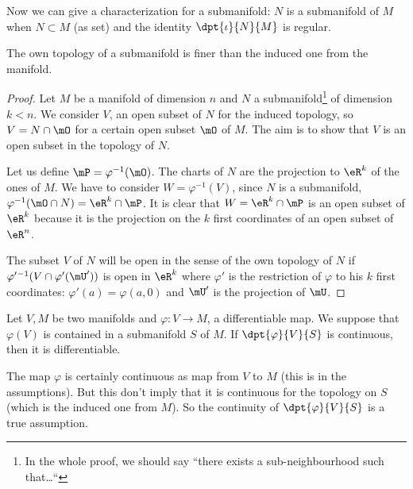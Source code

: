 Now we can give a characterization for a submanifold: $N$ is a submanifold of $M$ when $N\subset M$ (as set) and the identity $\dpt{\iota}{N}{M}$ is regular.\label{pg:caract_subvar}

\begin{proposition}\label{prop:topo_sub_manif}
The own topology of a submanifold is finer than the induced one from the manifold.
\end{proposition}

\begin{proof}
Let $M$ be a manifold of dimension $n$ and $N$ a submanifold\footnote{In the whole proof, we should say ``there exists a sub-neighbourhood such that\ldots``} of dimension $k<n$. We consider $V$, an open subset of $N$ for the induced topology, so $V=N\cap\mO$ for a certain open subset $\mO$ of $M$. The aim is to show that $V$ is an open subset in the topology of $N$.

Let us define $\mP=\varphi^{-1}(\mO)$.  The charts of $N$ are the projection to $\eR^k$ of the ones of $M$. We have to consider $W=\varphi^{-1}(V)$, since $N$ is a submanifold, $\varphi^{-1}(\mO\cap N)=\eR^k\cap\mP$. It is clear that $W=\eR^k\cap\mP$ is an open subset of $\eR^k$ because it is the projection on the $k$ first coordinates of an open subset of $\eR^n$.

The subset $V$ of $N$ will be open in the sense of the own topology of $N$ if $\varphi'{}^{-1}(V\cap\varphi'(\mU'))$ is open in $\eR^k$ where $\varphi'$ is the restriction of $\varphi$ to his $k$ first coordinates: $\varphi'(a)=\varphi(a,0)$ and $\mU'$ is the projection of $\mU$.
\end{proof}


\begin{lemma}
Let $V,M$ be two manifolds and $\varphi\colon V\to M$, a differentiable map. We suppose that $\varphi(V)$ is contained in a submanifold $S$ of $M$. If $\dpt{\varphi}{V}{S}$ is continuous, then it is differentiable.
\label{lem:var_cont_diff}
\end{lemma}

\begin{remark}
The map $\varphi$ is certainly continuous as map from $V$ to $M$ (this is in the assumptions). But this don't imply that it is continuous for the topology on $S$ (which is the induced one from $M$). So the continuity of $\dpt{\varphi}{V}{S}$ is a true assumption.
\end{remark}

